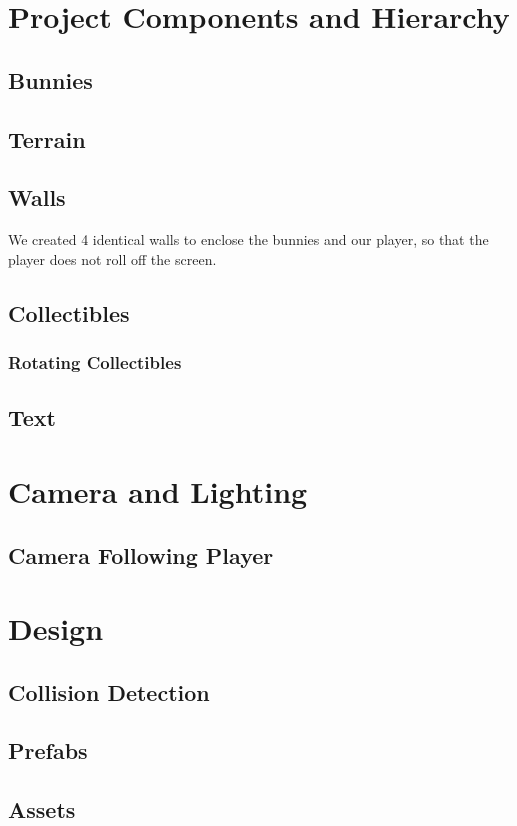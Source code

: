 \documentclass[12pt]{article}
\begin{document}
\section{Project Components and Hierarchy}
\subsection{Bunnies}

\subsection{Terrain}

\subsection{Walls}
We created 4 identical walls to enclose the bunnies and our player, so that the player does not roll off the screen.

\subsection{Collectibles}


\subsubsection{Rotating Collectibles}


\subsection{Text}


\section{Camera and Lighting}
\subsection{Camera Following Player}


\section{Design}
\subsection{Collision Detection}
\subsection{Prefabs}
\subsection{Assets}
\end{document}

